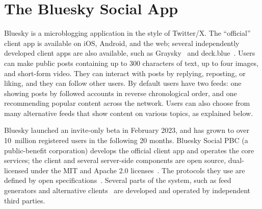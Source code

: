 \documentclass[sigconf]{acmart}
\begin{document}

\section{The Bluesky Social App}\label{sec:product}

Bluesky is a microblogging application in the style of Twitter/X. %
The ``official'' client app is available on iOS, Android, and the web; several independently developed client apps are also available, such as Graysky~\cite{Graysky} and deck.blue~\cite{deck.blue}.
Users can make public posts containing up to 300 characters of text, up to four images, and short-form video.
They can interact with posts by replying, reposting, or liking, and they can follow other users.
By default users have two feeds: one showing posts by followed accounts in reverse chronological order, and one recommending popular content across the network.
Users can also choose from many alternative feeds that show content on various topics, as explained below.


Bluesky launched an invite-only beta in February 2023, and has grown to over 10~million registered users in the following 20 months. %
Bluesky Social PBC (a public-benefit corporation) develops the official client app and operates the core services; the client and several server-side components are open source, dual-licensed under the MIT and Apache 2.0 licenses~\cite{BlueskyGithub}.
The protocols they use are defined by open specifications~\cite{AtProtoSpecs}.
Several parts of the system, such as feed generators and alternative clients~\cite{AtProtoClients} are developed and operated by independent third parties.
\end{document}
